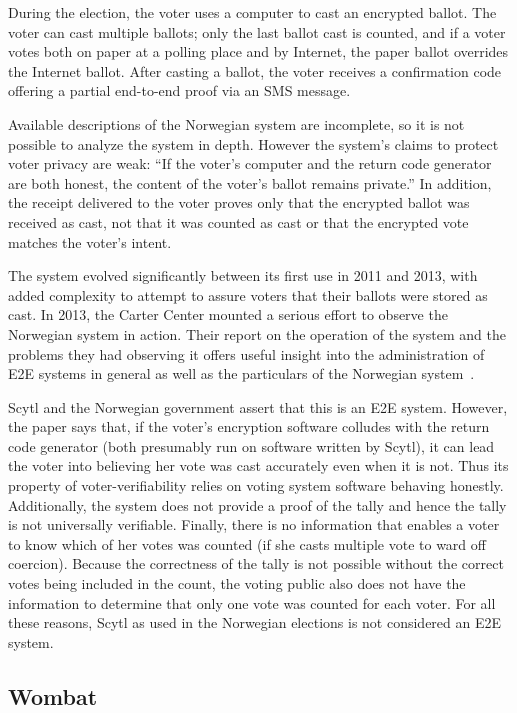 During the election, the voter uses a computer to cast an encrypted
ballot. The voter can cast multiple ballots; only the last ballot cast
is counted, and if a voter votes both on paper at a polling place and
by Internet, the paper ballot overrides the Internet ballot. After
casting a ballot, the voter receives a confirmation code offering a
partial end-to-end proof via an SMS message.

Available descriptions of the Norwegian system are incomplete, so it
is not possible to analyze the system in depth. However the system's
claims to protect voter privacy are weak: ``If the voter's computer
and the return code generator are both honest, the content of the
voter's ballot remains private.'' In addition, the receipt delivered
to the voter proves only that the encrypted ballot was received as
cast, not that it was counted as cast or that the encrypted vote
matches the voter's intent.

The system evolved significantly between its first use in 2011 and
2013, with added complexity to attempt to assure voters that their
ballots were stored as cast. In 2013, the Carter Center mounted a
serious effort to observe the Norwegian system in action. Their
report on the operation of the system and the problems
they had observing it offers useful insight into the administration of
E2E systems in general as well as the particulars of the Norwegian
system~\cite{carter2013}.

Scytl and the
Norwegian government assert that this is an E2E system. However, the paper says that, if the voter's encryption software colludes with the return code generator (both presumably run on software written by Scytl), it can lead the voter into believing her vote was cast accurately even when it is not. Thus its property of voter-verifiability relies on voting system software behaving honestly. Additionally, the system does not provide a proof of the tally and hence the tally is not universally verifiable. Finally, there is no information that enables a voter to know which of her votes was counted (if she casts multiple vote to ward off coercion). Because the correctness of the tally is not possible without the correct votes being included in the count, the voting public also does not have the information to determine that only one vote was counted for each voter. For all these reasons, Scytl as used in the Norwegian elections is not considered an E2E system. 

\subsection{Wombat}

